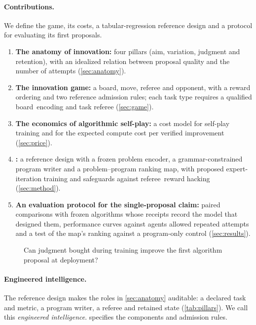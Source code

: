 \paragraph{Contributions.}
We define the game, its costs, a tabular-regression reference design
and a protocol for evaluating its first proposals.
\begin{enumerate}[leftmargin=*,itemsep=2pt,topsep=3pt,label=\arabic*.]
  \item \textbf{The anatomy of innovation:} four pillars (aim, variation,
    judgment and retention), with an idealized relation between proposal
    quality and the number of attempts (\cref{sec:anatomy}).
  \item \textbf{The innovation game:} a board, move, referee and \mbox{opponent},
    with a reward ordering and two reference admission rules; each task
    type requires a qualified \mbox{board encoding} and task referee (\cref{sec:game}).
  \item \textbf{The economics of algorithmic self-play:} a cost model for
    self-play training and for the expected compute cost per verified improvement (\cref{sec:price}).
  \item \textbf{\EZ{}:} a reference design with a frozen problem encoder,
    a grammar-constrained program writer and a problem--program ranking map,
    with proposed expert-\hspace{0pt}iteration training and safeguards against
    \mbox{referee reward} hacking (\cref{sec:method}).
  \item \textbf{An evaluation protocol for the single-proposal claim:}
    paired comparisons with frozen algorithms whose receipts record the
    model that designed them, performance curves against agents
    allowed repeated attempts and a test of the map's ranking against a
    program-only control (\cref{sec:results}).
\end{enumerate}

\begin{figure}[tb]%
\begin{keyidea}
Can judgment bought during training improve the first algorithm proposal at deployment?
\end{keyidea}
\end{figure}

\paragraph{Engineered intelligence.}
The reference design makes the roles in \cref{sec:anatomy} auditable:
a declared task and metric, a program writer, a referee and retained state
(\cref{tab:pillars}). We call this \emph{engineered intelligence}.
 specifies the components and admission rules.

